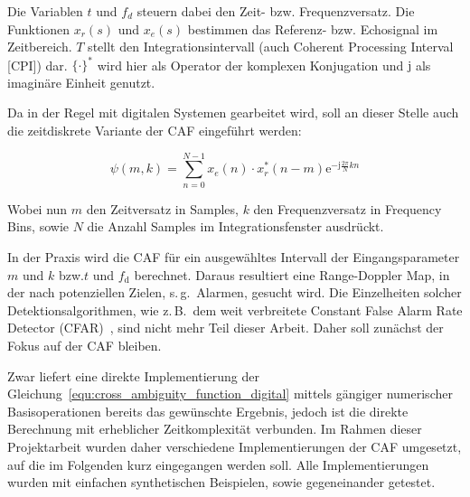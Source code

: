 Die Variablen \(t\) und \(f_{d}\) steuern dabei den Zeit- bzw. Frequenzversatz. Die Funktionen \(x_{r}(s)\) und \(x_{e}(s)\) bestimmen das Referenz- bzw. Echosignal im Zeitbereich. \(T\) stellt den Integrationsintervall (auch Coherent Processing Interval [CPI]) dar. \({\{}\cdot{\}}^{*}\) wird hier als Operator der komplexen Konjugation und \(\mathrm{j}\) als imaginäre Einheit genutzt.

Da in der Regel mit digitalen Systemen gearbeitet wird, soll an dieser Stelle auch die zeitdiskrete Variante der CAF eingeführt werden:

\begin{equation}\label{equ:cross_ambiguity_function_digital}
    \psi(m, k) = \sum_{n = 0}^{N - 1}{x_{e}(n) \cdot x_{r}^{*}(n - m) \mathrm{e}^{-\mathrm{j} \frac{2 \pi}{N} k n}}
\end{equation}

Wobei nun \(m\) den Zeitversatz in Samples, \(k\) den Frequenzversatz in Frequency Bins, sowie \(N\) die Anzahl Samples im Integrationsfenster ausdrückt.

In der Praxis wird die CAF für ein ausgewähltes Intervall der Eingangsparameter \(m\) und \(k\) bzw.\@ \(t\) und \(f_\text{d}\) berechnet. Daraus resultiert eine Range-Doppler Map, in der nach potenziellen Zielen, s.\,g.\ Alarmen, gesucht wird. Die Einzelheiten solcher Detektionsalgorithmen, wie z.\,B.\ dem weit verbreitete Constant False Alarm Rate Detector (CFAR)~\cite[S.~208--230]{Malanowski2019}, sind nicht mehr Teil dieser Arbeit. Daher soll zunächst der Fokus auf der CAF bleiben.

Zwar liefert eine direkte Implementierung der Gleichung~\ref{equ:cross_ambiguity_function_digital} mittels gängiger numerischer Basisoperationen bereits das gewünschte Ergebnis, jedoch ist die direkte Berechnung mit erheblicher Zeitkomplexität verbunden. Im Rahmen dieser Projektarbeit wurden daher verschiedene Implementierungen der CAF umgesetzt, auf die im Folgenden kurz eingegangen werden soll. Alle Implementierungen wurden mit einfachen synthetischen Beispielen, sowie gegeneinander getestet.

